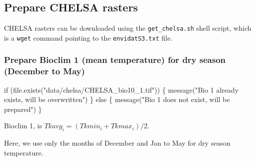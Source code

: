 \documentclass[
]{article}
\newenvironment{Shaded}{}{}
\newcommand{\ControlFlowTok}[1]{\textcolor[rgb]{0.00,0.00,1.00}{#1}}
\newcommand{\KeywordTok}[1]{\textcolor[rgb]{0.00,0.00,1.00}{#1}}
\newcommand{\NormalTok}[1]{#1}
\newcommand{\StringTok}[1]{\textcolor[rgb]{0.00,0.50,0.50}{#1}}
\begin{document}
\hypertarget{prepare-chelsa-rasters}{%
\subsection{Prepare CHELSA rasters}\label{prepare-chelsa-rasters}}

CHELSA rasters can be downloaded using the \texttt{get\_chelsa.sh} shell script, which is a \texttt{wget} command pointing to the \texttt{envidatS3.txt} file.

\hypertarget{prepare-bioclim-1-mean-temperature-for-dry-season-december-to-may}{%
\subsubsection{Prepare Bioclim 1 (mean temperature) for dry season (December to May)}\label{prepare-bioclim-1-mean-temperature-for-dry-season-december-to-may}}

\begin{Shaded}
\begin{Highlighting}[]
\ControlFlowTok{if}\NormalTok{ (}\KeywordTok{file.exists}\NormalTok{(}\StringTok{"data/chelsa/CHELSA_bio10_1.tif"}\NormalTok{)) \{}
  \KeywordTok{message}\NormalTok{(}\StringTok{"Bio 1 already exists, will be overwritten"}\NormalTok{)}
\NormalTok{\} }\ControlFlowTok{else}\NormalTok{ \{}
  \KeywordTok{message}\NormalTok{(}\StringTok{"Bio 1 does not exist, will be prepared"}\NormalTok{)}
\NormalTok{\}}
\end{Highlighting}
\end{Shaded}

Bioclim 1, is \(Tkavg_i = (Tkmin_i + Tkmax_i) / 2\).

Here, we use only the months of December and Jan to May for dry season temperature.
\end{document}
